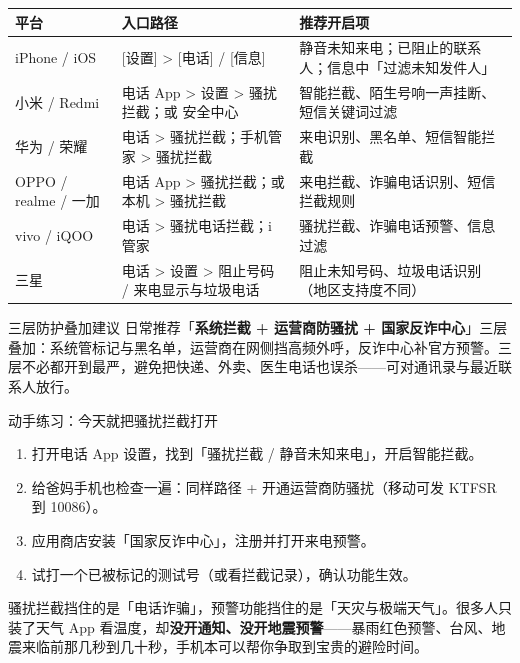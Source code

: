 \begin{center}
\begin{tabularx}{\linewidth}{|X|X|X|}
\hline
\textbf{平台} & \textbf{入口路径} & \textbf{推荐开启项} \tabularnewline
\hline
iPhone / iOS & {}[设置] > [电话] / [信息] & 静音未知来电；已阻止的联系人；信息中「过滤未知发件人」 \tabularnewline
小米 / Redmi & 电话 App > 设置 > 骚扰拦截；或 安全中心 & 智能拦截、陌生号响一声挂断、短信关键词过滤 \tabularnewline
华为 / 荣耀 & 电话 > 骚扰拦截；手机管家 > 骚扰拦截 & 来电识别、黑名单、短信智能拦截 \tabularnewline
OPPO / realme / 一加 & 电话 App > 骚扰拦截；或 本机 > 骚扰拦截 & 来电拦截、诈骗电话识别、短信拦截规则 \tabularnewline
vivo / iQOO & 电话 > 骚扰电话拦截；i 管家 & 骚扰拦截、诈骗电话预警、信息过滤 \tabularnewline
三星 & 电话 > 设置 > 阻止号码 / 来电显示与垃圾电话 & 阻止未知号码、垃圾电话识别（地区支持度不同） \tabularnewline
\hline
\end{tabularx}
\end{center}

\begin{tcbinfo}{三层防护叠加建议}
日常推荐「\textbf{系统拦截 + 运营商防骚扰 + 国家反诈中心}」三层叠加：系统管标记与黑名单，运营商在网侧挡高频外呼，反诈中心补官方预警。三层不必都开到最严，避免把快递、外卖、医生电话也误杀——可对通讯录与最近联系人放行。

\end{tcbinfo}

\begin{tcbpractice}{动手练习：今天就把骚扰拦截打开}
\begin{enumerate}
  \item 打开电话 App 设置，找到「骚扰拦截 / 静音未知来电」，开启智能拦截。
  \item 给爸妈手机也检查一遍：同样路径 + 开通运营商防骚扰（移动可发 KTFSR 到 10086）。
  \item 应用商店安装「国家反诈中心」，注册并打开来电预警。
  \item 试打一个已被标记的测试号（或看拦截记录），确认功能生效。
\end{enumerate}

\end{tcbpractice}


骚扰拦截挡住的是「电话诈骗」，预警功能挡住的是「天灾与极端天气」。很多人只装了天气 App 看温度，却\textbf{没开通知、没开地震预警}——暴雨红色预警、台风、地震来临前那几秒到几十秒，手机本可以帮你争取到宝贵的避险时间。


